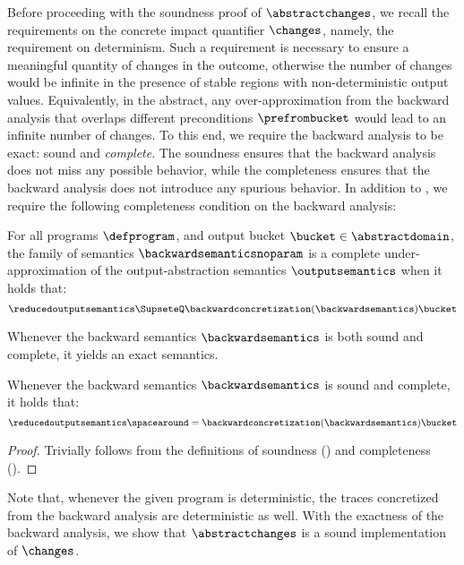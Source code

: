 Before proceeding with the soundness proof of $\abstractchanges$, we recall the requirements on the concrete impact quantifier $\changes$, namely, the requirement on determinism.
Such a requirement is necessary to ensure a meaningful quantity of changes in the outcome, otherwise the number of changes would be infinite in the presence of stable regions with non-deterministic output values.
Equivalently, in the abstract, any over-approximation from the backward analysis that overlaps different preconditions $\prefrombucket$ would lead to an infinite number of changes.
To this end, we require the backward analysis to be exact: sound and \emph{complete}.
The soundness ensures that the backward analysis does not miss any possible behavior, while the completeness ensures that the backward analysis does not introduce any spurious behavior.
In addition to , we require the following completeness condition on the backward analysis:

\begin{definition}
  For all programs $\defprogram$, and output bucket $\bucket\in\abstractdomain$, the family of semantics $\backwardsemanticsnoparam$ is a \textup{complete under-approximation} of the output-abstraction semantics $\outputsemantics$
  when it holds that:
  \[\reducedoutputsemantics \SupseteQ \backwardconcretization(\backwardsemantics)\bucket\]
\end{definition}

Whenever the backward semantics $\backwardsemantics$ is both sound and complete, it yields an exact semantics.

\begin{lemma}
  Whenever the backward semantics $\backwardsemantics$ is sound and complete, it holds that:
  \[\reducedoutputsemantics \spacearound= \backwardconcretization(\backwardsemantics)\bucket\]
\end{lemma}
\begin{proof}
  Trivially follows from the definitions of soundness () and completeness ().
\end{proof}

Note that, whenever the given program is deterministic, the traces concretized from the backward analysis are deterministic as well.
With the exactness of the backward analysis, we show that $\abstractchanges$ is a sound implementation of $\changes$.

